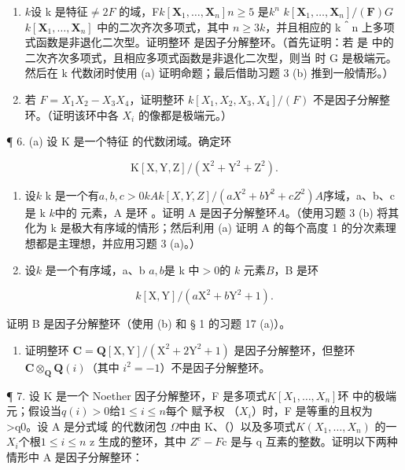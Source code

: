 \begin{enumerate}
\def\labelenumi{(\alph{enumi})}
\setcounter{enumi}{1}
\item
  \(k\)设 k 是特征\(\neq 2\)\(F\)  的域，F\(k[\mathbf{X}_1, \ldots, \mathbf{X}_n]\)\(n \geqslant 5\) 是\(k^n\) \(k[\mathbf{X}_1, \ldots, \mathbf{X}_n] / (\mathbf{F})\)\(G\)\(k[\mathbf{X}_1, \ldots, \mathbf{X}_n]\) 中的二次齐次多项式，其中 \(n \geqslant 3\)\(k\)，并且相应的 k＾n 上多项式函数是非退化二次型。证明整环  是因子分解整环。（首先证明：若  是  中的二次齐次多项式，且相应多项式函数是非退化二次型，则当  时 G 是极端元。然后在 k 代数闭时使用 (a) 证明命题；最后借助习题 3 (b) 推到一般情形。）
\item
  若 \(F = X_{1}X_{2} - X_{3}X_{4}\)，证明整环 \(k[X_{1}, X_{2}, X_{3}, X_{4}]/(F)\) 不是因子分解整环。（证明该环中各 \(X_{i}\) 的像都是极端元。）
\end{enumerate}

¶ 6. (a) 设 K 是一个特征  的代数闭域。确定环

\[
\mathrm{K} [ \mathrm{X}, \mathrm{Y}, \mathrm{Z} ] / (\mathrm{X} ^ {2} + \mathrm{Y} ^ {2} + \mathrm{Z} ^ {2}).
\]

\begin{enumerate}
\def\labelenumi{(\alph{enumi})}
\setcounter{enumi}{1}
\item
  设\(k\) k 是一个有\(a, b, c\)\(>0\)\(k\)\(A\)\(k[X, Y, Z] / (aX^2 + bY^2 + cZ^2)\)\(A\)序域，a、b、c 是 k \(k\)中的  元素，A 是环 。证明 A 是因子分解整环\(A\)。（使用习题 3 (b) 将其化为 k 是极大有序域的情形；然后利用 (a) 证明 A 的每个高度 1 的分次素理想都是主理想，并应用习题 3 (a)。）
\item
  设\(k\)  是一个有序域，a、b \(a, b\)是 k 中\(> 0\)的 \(k\) 元素\(B\)，B 是环
\end{enumerate}

\[
k [ \mathrm{X}, \mathrm{Y} ] / (a \mathrm{X} ^ {2} + b \mathrm{Y} ^ {2} + 1).
\]

证明 B 是因子分解整环（使用 (b) 和 § 1 的习题 17 (a)）。

\begin{enumerate}
\def\labelenumi{(\alph{enumi})}
\setcounter{enumi}{3}
\tightlist
\item
  证明整环 \(\mathbf{C} = \mathbf{Q}[\mathrm{X},\mathrm{Y}] / (\mathrm{X}^2 +2\mathrm{Y}^2 +1)\) 是因子分解整环，但整环 \(\mathbf{C}\otimes_{\mathbf{Q}}\mathbf{Q}(i)\)（其中 \(i^2 = -1\)）不是因子分解整环。
\end{enumerate}

¶ 7. 设 K 是一个 Noether 因子分解整环，F 是多项式\(K[X_{1},\ldots,X_{n}]\)环  中的极端元；假设当\(q(i)>0\)给\(1\leqslant i\leqslant n\)每个  赋予权 （\(X_{i}\)）时，F 是等重的且权为\textgreater q0。设 A 是分式域  的代数闭包  \(\Omega\)中由 K、（）以及多项式\(K(X_{1},\ldots,X_{n})\)  的一\(X_{i}\)个根\(1\leqslant i\leqslant n\) z 生成的整环，其中 \(Z^{c}-F\)c 是与 q 互素的整数。证明以下两种情形中 A 是因子分解整环：

